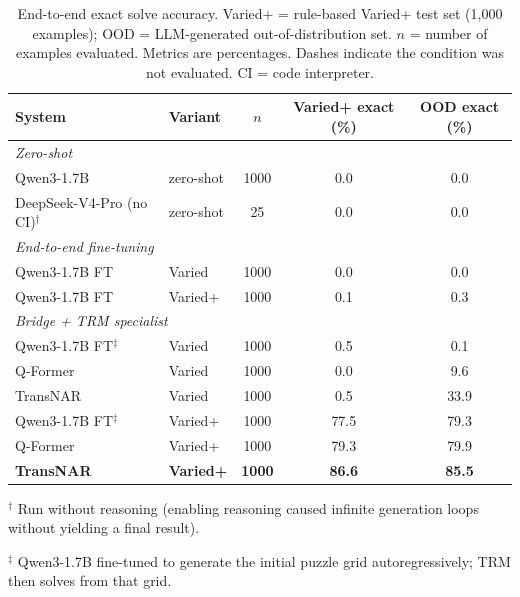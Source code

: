 \documentclass[11pt]{article}
\begin{document}
\begin{table}[!t]
\centering
\caption{End-to-end exact solve accuracy. Varied+ = rule-based Varied+ test set (1,000 examples); OOD = LLM-generated out-of-distribution set. $n$ = number of examples evaluated. Metrics are percentages. Dashes indicate the condition was not evaluated. CI = code interpreter.}
\label{tab:e2e_results}
\begin{tabular}{llccc}
\toprule
System & Variant & $n$ & Varied+ exact (\%) & OOD exact (\%) \\
\midrule
\multicolumn{5}{l}{\textit{Zero-shot}} \\
\midrule
Qwen3-1.7B                      & zero-shot           & 1000 & 0.0 & 0.0 \\
DeepSeek-V4-Pro (no CI)$^\dagger$ & zero-shot           & 25   & 0.0 & 0.0 \\
\midrule
\multicolumn{5}{l}{\textit{End-to-end fine-tuning}} \\
\midrule
Qwen3-1.7B FT                   & Varied              & 1000 & 0.0 & 0.0 \\
Qwen3-1.7B FT                   & Varied+             & 1000 & 0.1 & 0.3 \\
\midrule
\multicolumn{5}{l}{\textit{Bridge + TRM specialist}} \\
\midrule
Qwen3-1.7B FT$^\ddagger$        & Varied              & 1000 & 0.5 & 0.1 \\
Q-Former                 & Varied              & 1000 & 0.0 & 9.6 \\
TransNAR                 & Varied              & 1000 & 0.5 & 33.9 \\
Qwen3-1.7B FT$^\ddagger$        & Varied+             & 1000 & 77.5 & 79.3 \\
Q-Former                 & Varied+             & 1000 & 79.3 & 79.9 \\
\textbf{TransNAR}                 & \textbf{Varied+}             & \textbf{1000} & \textbf{86.6} & \textbf{85.5} \\
\bottomrule
\end{tabular}

\vspace{0.5em}
\noindent\small $^\dagger$ Run without reasoning (enabling reasoning caused infinite generation loops without yielding a final result).

\noindent\small $^\ddagger$ Qwen3-1.7B fine-tuned to generate the initial puzzle grid autoregressively; TRM then solves from that grid.
\end{table}
\end{document}
